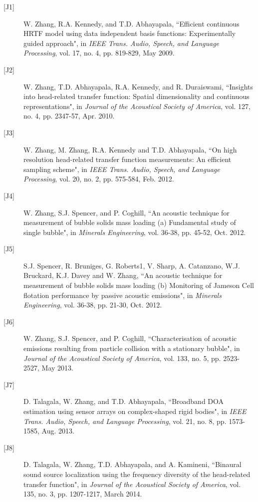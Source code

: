 \documentclass[10pt]{article}
\begin{document}
\begin{description}

\item[{[}J1{]}]W. Zhang, R.A. Kennedy, and T.D. Abhayapala,
``Efficient continuous HRTF model using data independent basis functions: Experimentally guided approach", in {\em
IEEE Trans. Audio, Speech, and Language Processing}, vol. 17, no. 4, pp. 819-829, May 2009.

\item[{[}J2{]}]W. Zhang, T.D. Abhayapala, R.A. Kennedy, and R. Duraiswami,
``Insights into head-related transfer function: Spatial dimensionality and continuous representations",
in \emph{Journal of the Acoustical Society of America}, vol. 127, no. 4, pp. 2347-57, Apr. 2010.

\item[{[}J3{]}]W. Zhang, M. Zhang, R.A. Kennedy and T.D. Abhayapala, ``On high resolution head-related transfer function measurements: An efficient sampling scheme", in \emph{IEEE Trans. Audio, Speech, and Language Processing}, vol. 20, no. 2, pp. 575-584, Feb. 2012.

\item[{[}J4{]}]W. Zhang, S.J. Spencer, and P. Coghill,
``An acoustic technique for measurement of bubble solids mass loading (a) Fundamental study of single bubble", in {\em Minerals Engineering}, vol. 36-38, pp. 45-52, Oct. 2012.

\item[{[}J5{]}]S.J. Spencer, R. Bruniges, G. Roberts1, V. Sharp, A. Catanzano, W.J. Bruckard, K.J. Davey and W. Zhang,
``An acoustic technique for measurement of bubble solids mass loading (b) Monitoring of Jameson Cell flotation performance by passive acoustic emissions", in {\em Minerals Engineering}, vol. 36-38, pp. 21-30, Oct. 2012.

\item[{[}J6{]}]W. Zhang, S.J. Spencer, and P. Coghill, ``Characterisation of acoustic emissions resulting from particle collision with a stationary bubble", in {\em Journal of the Acoustical Society of America}, vol. 133, no. 5, pp. 2523-2527, May 2013.

\item[{[}J7{]}]D. Talagala, W. Zhang, and T.D. Abhayapala, ``Broadband DOA estimation using sensor arrays on complex-shaped rigid bodies", in {\em IEEE Trans. Audio, Speech, and Language Processing}, vol. 21, no. 8, pp. 1573-1585, Aug. 2013.

\item[{[}J8{]}]D. Talagala, W. Zhang, T.D. Abhayapala, and A. Kamineni, ``Binaural sound source localization using the frequency diversity of the head-related transfer function", in {\em Journal of the Acoustical Society of America}, vol. 135, no. 3, pp. 1207-1217, March 2014.


\end{description}
\end{document}
